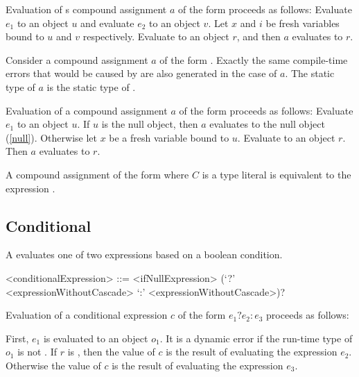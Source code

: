 \documentclass[makeidx]{article}
\begin{document}
{\LMHash{}%
Evaluation of s compound assignment $a$ of the form
proceeds as follows:
Evaluate $e_1$ to an object $u$ and evaluate $e_2$ to an object $v$.
Let $x$ and $i$ be fresh variables bound to $u$ and $v$ respectively.
Evaluate  to an object $r$,
and then $a$ evaluates to $r$.
\EndCase

\LMHash{}%
Consider a compound assignment $a$ of the form .
Exactly the same compile-time errors that would be caused by
are also generated in the case of $a$.
The static type of $a$ is the static type of .

\LMHash{}%
Evaluation of a compound assignment $a$ of the form
proceeds as follows:
Evaluate $e_1$ to an object $u$.
If $u$ is the null object, then $a$ evaluates to the null object (\ref{null}).
Otherwise let $x$ be a fresh variable bound to $u$.
Evaluate  to an object $r$.
Then $a$ evaluates to $r$.
\EndCase

\LMHash{}%
A compound assignment of the form 
where $C$ is a type literal
is equivalent to the expression .
\EndCase


\subsection{Conditional}

\LMHash{}%
A  evaluates one of two expressions based on a boolean condition.

\begin{grammar}
<conditionalExpression> ::= <ifNullExpression>
  \gnewline{} (`?' <expressionWithoutCascade> `:' <expressionWithoutCascade>)?
\end{grammar}

\LMHash{}%
Evaluation of a conditional expression $c$ of the form $e_1 ? e_2 : e_3$ proceeds as follows:

\LMHash{}%
First, $e_1$ is evaluated to an object $o_1$.
It is a dynamic error if the run-time type of $o_1$ is not .
If $r$ is \TRUE, then the value of $c$ is the result of evaluating the expression $e_2$.
Otherwise the value of $c$ is the result of evaluating the expression $e_3$.

}
\end{document}
